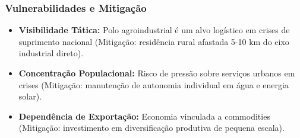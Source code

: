 \subsubsection{Vulnerabilidades e
Mitigação}

\begin{itemize}
\tightlist
\item
  \textbf{Visibilidade Tática:} Polo agroindustrial é um alvo logístico
  em crises de suprimento nacional (Mitigação: residência rural afastada
  5-10 km do eixo industrial direto).
\item
  \textbf{Concentração Populacional:} Risco de pressão sobre serviços
  urbanos em crises (Mitigação: manutenção de autonomia individual em
  água e energia solar).
\item
  \textbf{Dependência de Exportação:} Economia vinculada a commodities
  (Mitigação: investimento em diversificação produtiva de pequena
  escala).
\end{itemize}

